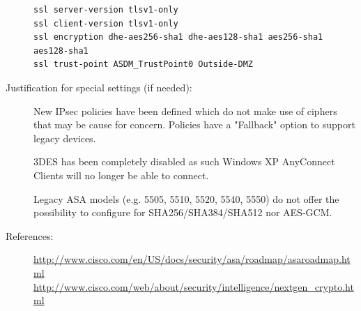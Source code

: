 \begin{description}
\begin{lstlisting}[breaklines]
ssl server-version tlsv1-only
ssl client-version tlsv1-only
ssl encryption dhe-aes256-sha1 dhe-aes128-sha1 aes256-sha1 aes128-sha1
ssl trust-point ASDM_TrustPoint0 Outside-DMZ
\end{lstlisting}

\item[Justification for special settings (if needed):] \mbox{}
New IPsec policies have been defined which do not make use of ciphers that may be cause for concern. Policies have a "Fallback" option to support legacy devices.

3DES has been completely disabled as such Windows XP AnyConnect Clients will no longer be able to connect.

Legacy ASA models (e.g. 5505, 5510, 5520, 5540, 5550) do not offer the possibility to configure for SHA256/SHA384/SHA512 nor AES-GCM.

\item[References:] 
\url{http://www.cisco.com/en/US/docs/security/asa/roadmap/asaroadmap.html}\\
\url{http://www.cisco.com/web/about/security/intelligence/nextgen_crypto.html}



\end{description}













